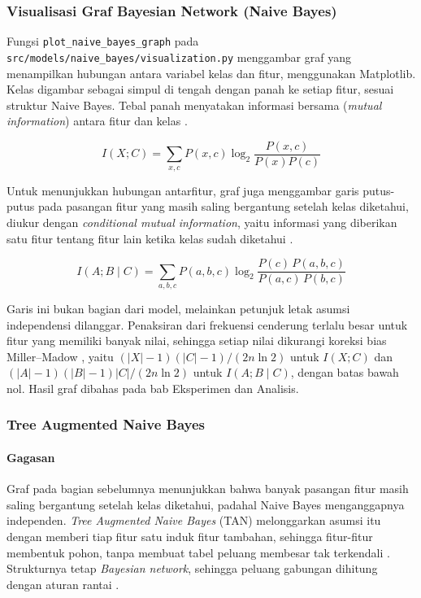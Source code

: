 \subsubsection{Visualisasi Graf Bayesian Network (Naive Bayes)}

Fungsi \texttt{plot\_naive\_bayes\_graph} pada \texttt{src/models/naive\_bayes/visualization.py} menggambar graf yang menampilkan hubungan antara variabel kelas dan fitur, menggunakan Matplotlib. Kelas digambar sebagai simpul di tengah dengan panah ke setiap fitur, sesuai struktur Naive Bayes. Tebal panah menyatakan informasi bersama (\textit{mutual information}) antara fitur dan kelas \cite{ref:cover-2006}.

\[
I(X;C)=\sum_{x,c}P(x,c)\log_2\frac{P(x,c)}{P(x)P(c)}
\]

Untuk menunjukkan hubungan antarfitur, graf juga menggambar garis putus-putus pada pasangan fitur yang masih saling bergantung setelah kelas diketahui, diukur dengan \textit{conditional mutual information}, yaitu informasi yang diberikan satu fitur tentang fitur lain ketika kelas sudah diketahui \cite{ref:friedman-1997}.

\[
I(A;B\mid C)=\sum_{a,b,c}P(a,b,c)\log_2\frac{P(c)\,P(a,b,c)}{P(a,c)\,P(b,c)}
\]

Garis ini bukan bagian dari model, melainkan petunjuk letak asumsi independensi dilanggar. Penaksiran dari frekuensi cenderung terlalu besar untuk fitur yang memiliki banyak nilai, sehingga setiap nilai dikurangi koreksi bias Miller--Madow \cite{ref:miller-1955}, yaitu $(|X|-1)(|C|-1)/(2n\ln 2)$ untuk $I(X;C)$ dan $(|A|-1)(|B|-1)|C|/(2n\ln 2)$ untuk $I(A;B\mid C)$, dengan batas bawah nol. Hasil graf dibahas pada bab Eksperimen dan Analisis.

\subsubsection{Tree Augmented Naive Bayes}

\paragraph{Gagasan}
Graf pada bagian sebelumnya menunjukkan bahwa banyak pasangan fitur masih saling bergantung setelah kelas diketahui, padahal Naive Bayes menganggapnya independen. \textit{Tree Augmented Naive Bayes} (TAN) melonggarkan asumsi itu dengan memberi tiap fitur satu induk fitur tambahan, sehingga fitur-fitur membentuk pohon, tanpa membuat tabel peluang membesar tak terkendali \cite{ref:friedman-1997}. Strukturnya tetap \textit{Bayesian network}, sehingga peluang gabungan dihitung dengan aturan rantai \cite{ref:materi-14}.

